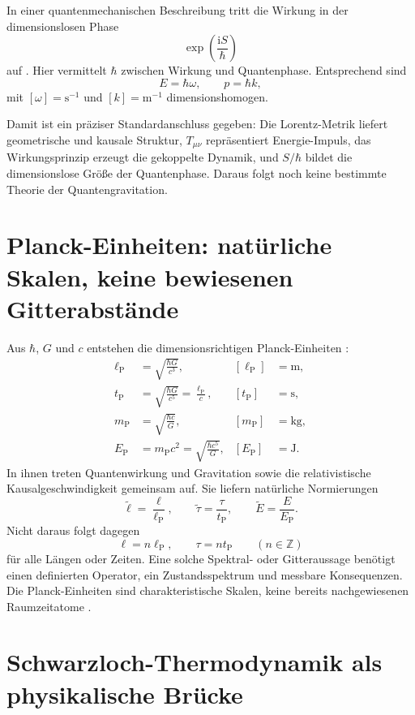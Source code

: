 \documentclass[11pt,a4paper]{article}
\theoremstyle{remark}
\begin{document}
In einer quantenmechanischen Beschreibung tritt die Wirkung in der
dimensionslosen Phase
\[
  \exp\!\left(\frac{\mathrm iS}{\hbar}\right)
\]
auf \citep{feynman1948}. Hier vermittelt \(\hbar\) zwischen Wirkung und
Quantenphase. Entsprechend sind
\[
  E=\hbar\omega,
  \qquad p=\hbar k,
\]
mit \([\omega]=\mathrm{s^{-1}}\) und \([k]=\mathrm{m^{-1}}\)
dimensionshomogen.

Damit ist ein präziser Standardanschluss gegeben: Die Lorentz-Metrik liefert
geometrische und kausale Struktur, \(T_{\mu\nu}\) repräsentiert
Energie-Impuls, das Wirkungsprinzip erzeugt die gekoppelte Dynamik, und
\(S/\hbar\) bildet die dimensionslose Größe der Quantenphase. Daraus folgt
noch keine bestimmte Theorie der Quantengravitation.

\section{Planck-Einheiten: natürliche Skalen, keine bewiesenen Gitterabstände}
\label{sec:planck-einheiten}

Aus \(\hbar\), \(G\) und \(c\) entstehen die dimensionsrichtigen
Planck-Einheiten \citep{codata2022}:
\[
\begin{aligned}
  \ell_{\mathrm P}&=\sqrt{\frac{\hbar G}{c^3}},
  & [\ell_{\mathrm P}]&=\mathrm m,\\
  t_{\mathrm P}&=\sqrt{\frac{\hbar G}{c^5}}
  =\frac{\ell_{\mathrm P}}{c},
  & [t_{\mathrm P}]&=\mathrm s,\\
  m_{\mathrm P}&=\sqrt{\frac{\hbar c}{G}},
  & [m_{\mathrm P}]&=\mathrm{kg},\\
  E_{\mathrm P}&=m_{\mathrm P}c^2
  =\sqrt{\frac{\hbar c^5}{G}},
  & [E_{\mathrm P}]&=\mathrm J.
\end{aligned}
\]
In ihnen treten Quantenwirkung und Gravitation sowie die relativistische
Kausalgeschwindigkeit gemeinsam auf. Sie liefern natürliche Normierungen
\[
  \widetilde\ell=\frac{\ell}{\ell_{\mathrm P}},
  \qquad
  \widetilde\tau=\frac{\tau}{t_{\mathrm P}},
  \qquad
  \widetilde E=\frac{E}{E_{\mathrm P}}.
\]
Nicht daraus folgt dagegen
\[
  \ell=n\ell_{\mathrm P},
  \qquad \tau=nt_{\mathrm P}
  \qquad(n\in\mathbb Z)
\]
für alle Längen oder Zeiten. Eine solche Spektral- oder Gitteraussage
benötigt einen definierten Operator, ein Zustandsspektrum und messbare
Konsequenzen. Die Planck-Einheiten sind charakteristische Skalen, keine
bereits nachgewiesenen Raumzeitatome \citep{hossenfelder2013}.

\section{Schwarzloch-Thermodynamik als physikalische Brücke}
\label{sec:horizont-information}
\end{document}
